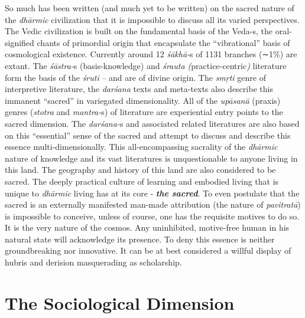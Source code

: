 So much has been written (and much yet to be written) on the sacred nature of the \textit{dhārmic} civilization that it is impossible to discuss all its varied perspectives. The Vedic civilization is built on the fundamental basis of the Veda-s, the oral-signified chants of primordial origin that encapsulate the “vibrational” basis of cosmological existence. Currently around 12 \textit{śākhā-}s of 1131 branches (∼1\%) are extant. The \textit{śāstra-}s (basis-knowledge) and \textit{śrauta (}practice-centric\textit{)} literature form the basis of the \textit{śruti} – and are of divine origin. The \textit{smṛti} genre of interpretive literature, the \textit{darśana} texts and meta-texts also describe this immanent “sacred” in variegated dimensionality. All of the \textit{upāsanā} (praxis) genres (\textit{stotra} and \textit{mantra-}s) of literature are experiential entry points to the sacred dimension. The \textit{darśana-}s and associated related literatures are also based on this “essential” sense of the sacred and attempt to discuss and describe this essence multi-dimensionally. This all-encompassing sacrality of the \textit{dhārmic} nature of knowledge and its vast literatures is unquestionable to anyone living in this land. The geography and history of this land are also considered to be sacred. The deeply practical culture of learning and embodied living that is unique to \textit{dhārmic} living has at its core - \textbf{\textit{the sacred}}. To even postulate that the sacred is an externally manifested man-made attribution (the nature of \textit{pavitratā}) is impossible to conceive, unless of course, one has the requisite motives to do so. It is the very nature of the cosmos. Any uninhibited, motive-free human in his natural state will acknowledge its presence. To deny this essence is neither groundbreaking nor innovative. It can be at best considered a willful display of hubris and derision masquerading as scholarship.


\section*{The Sociological Dimension}


